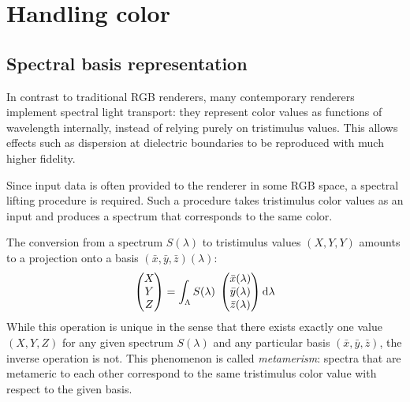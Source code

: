 \chapter{Handling color}\label{ch:color}

\section{Spectral basis representation}

In contrast to traditional RGB renderers, many contemporary renderers implement 
spectral light transport: they represent color values as functions of wavelength
internally, instead of relying purely on tristimulus values.
This allows effects such
as dispersion at dielectric boundaries to be reproduced with much higher fidelity.

Since input data is often provided to the renderer in some \gls{RGB} space,
a spectral lifting procedure is required. Such a procedure takes
tristimulus color values as an input and produces a spectrum that
corresponds to the same color.

The conversion from a spectrum $S(\lambda)$ to tristimulus values 
$(X, Y, Y)$ amounts to a projection onto a basis $(\bar x, \bar y, \bar z)(\lambda)$:
\begin{equation}
    \begin{pmatrix}X\\Y\\Z\end{pmatrix}
        = \int_\Lambda S(\lambda)\; 
    \begin{pmatrix}
        \bar x(\lambda)\\
        \bar y(\lambda)\\
        \bar z(\lambda)
    \end{pmatrix}
    \mathop{}\!\mathrm{d}\lambda
    \label{eqn:color_matching}
\end{equation}
While this operation is unique in the sense that there exists exactly one
value $(X,Y,Z)$ for any given spectrum $S(\lambda)$ and any particular basis
$(\bar x,\bar y, \bar z)$, the inverse operation is not. This phenomenon is called
\emph{metamerism}: spectra that are metameric to each other correspond to the
same tristimulus color value with respect to the given basis.

